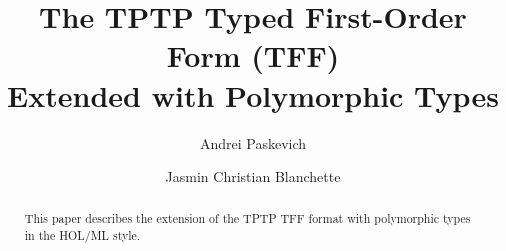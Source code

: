 \documentclass[draft,a4paper]{llncs}
\begin{document}
\title{
The TPTP Typed First-Order Form (TFF) \\ Extended with Polymorphic Types}

\author{
Andrei Paskevich \and Jasmin Christian Blanchette
}


\maketitle

\begin{abstract}
This paper describes the extension of the TPTP TFF format with polymorphic
types in the HOL/ML style.
\end{abstract}











\end{document}
